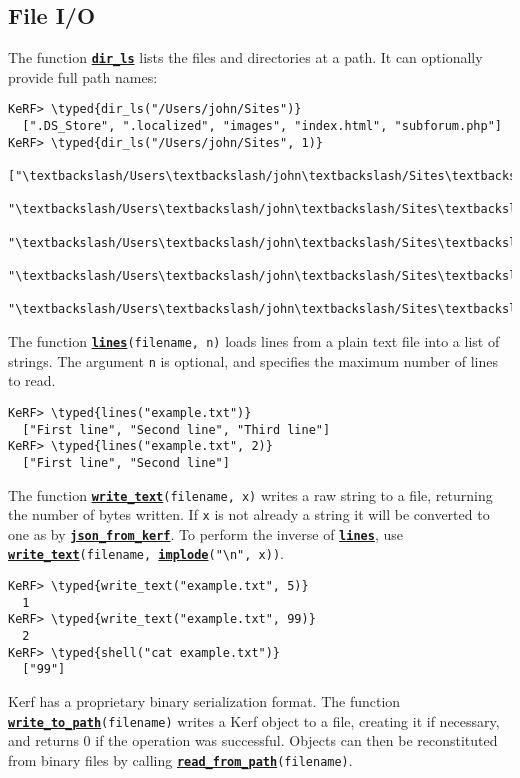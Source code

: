 \documentclass{article}
\newcommand{\typed}[1]{\textcolor{TealBlue}{#1}}
\newcommand{\primu}[2]{\hyperref[prim:#2]{\textbf{\texttt{#1}}}}
\newcommand{\prim}[1]{\primu{#1}{#1}}
\begin{document}
\subsection{File I/O}\label{sec:fileio}
The function \primu{dir\_ls}{dirLs} lists the files and directories at a path. It can optionally provide full path names:
\begin{Verbatim}
KeRF> \typed{dir_ls("/Users/john/Sites")}
  [".DS_Store", ".localized", "images", "index.html", "subforum.php"]
KeRF> \typed{dir_ls("/Users/john/Sites", 1)}
  ["\textbackslash/Users\textbackslash/john\textbackslash/Sites\textbackslash/.DS_Store"
   "\textbackslash/Users\textbackslash/john\textbackslash/Sites\textbackslash/.localized"
   "\textbackslash/Users\textbackslash/john\textbackslash/Sites\textbackslash/images"
   "\textbackslash/Users\textbackslash/john\textbackslash/Sites\textbackslash/index.html"
   "\textbackslash/Users\textbackslash/john\textbackslash/Sites\textbackslash/subforum.php"]
\end{Verbatim}

The function \prim{lines}\texttt{(filename, n)} loads lines from a plain text file into a list of strings. The argument \texttt{n} is optional, and specifies the maximum number of lines to read.

\begin{Verbatim}
KeRF> \typed{lines("example.txt")}
  ["First line", "Second line", "Third line"]
KeRF> \typed{lines("example.txt", 2)}
  ["First line", "Second line"]
\end{Verbatim}

The function \primu{write\_text}{writeText}\texttt{(filename, x)} writes a raw string to a file, returning the number of bytes written. If \texttt{x} is not already a string it will be converted to one as by \primu{json\_from\_kerf}{jsonFromKerf}. To perform the inverse of \prim{lines}, use \primu{write\_text}{writeText}\texttt{(filename, \prim{implode}("\textbackslash{}n", x))}.

\begin{Verbatim}
KeRF> \typed{write_text("example.txt", 5)}
  1
KeRF> \typed{write_text("example.txt", 99)}
  2
KeRF> \typed{shell("cat example.txt")}
  ["99"]
\end{Verbatim}

Kerf has a proprietary binary serialization format. The function \primu{write\_to\_path}{writeToPath}\texttt{(filename)} writes a Kerf object to a file, creating it if necessary, and returns 0 if the operation was successful. Objects can then be reconstituted from binary files by calling \primu{read\_from\_path}{readFromPath}\texttt{(filename)}.
\end{document}
